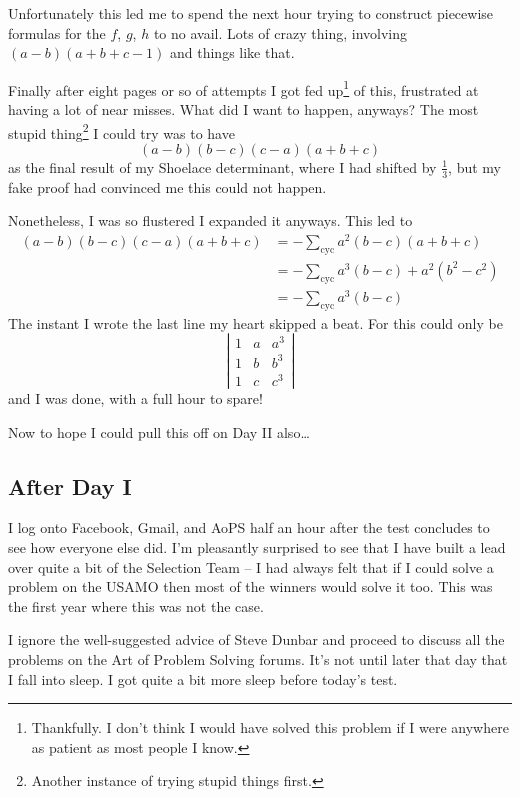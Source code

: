 \documentclass[11pt]{scrartcl}
\begin{document}
Unfortunately this led me to spend the next hour trying to construct piecewise formulas for the $f$, $g$,
$h$ to no avail.
Lots of crazy thing, involving $(a-b)(a+b+c-1)$ and things like that.

Finally after eight pages or so of attempts I got fed up\footnote{Thankfully.
I don't think I would have solved this problem if I were anywhere as patient as most people I know.} of this,
frustrated at having a lot of near misses.
What did I want to happen, anyways?
The most stupid thing\footnote{Another instance of trying stupid things first.} I could try was to have
\[ (a-b)(b-c)(c-a)(a+b+c) \]
as the final result of my Shoelace determinant, where I had shifted by $\tfrac 13$,
but my fake proof had convinced me this could not happen.

Nonetheless, I was so flustered I expanded it anyways. This led to
\begin{align*}
  (a-b)(b-c)(c-a)(a+b+c) &= -\sum_{\text{cyc}} a^2(b-c)(a+b+c) \\
  &= -\sum_{\text{cyc}} a^3(b-c) + a^2(b^2-c^2) \\
  &= -\sum_{\text{cyc}} a^3(b-c)
\end{align*}
The instant I wrote  the last line my heart skipped a beat. For this could only be
\[ \left\lvert
  \begin{array}{ccc}
    1 & a & a^3 \\
    1 & b & b^3 \\
    1 & c & c^3
  \end{array}
  \right\rvert \]
and I was done, with a full hour to spare!

Now to hope I could pull this off on Day II also\dots

\subsection{After Day I}
I log onto Facebook, Gmail, and AoPS half an hour after the test concludes to see how everyone else did.
I'm pleasantly surprised to see that I have built a lead over quite a bit of the
Selection Team -- I had always felt that if I could solve a problem on the USAMO
then most of the winners would solve it too. This was the first year where this was not the case.

I ignore the well-suggested advice of Steve Dunbar and proceed to discuss all
the problems on the Art of Problem Solving forums. It's not until later that day that I fall into sleep.
I got quite a bit more sleep before today's test.
\end{document}
